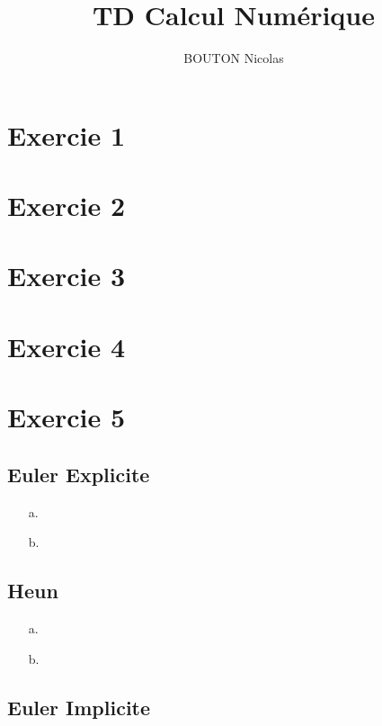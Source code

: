 \documentclass[12pt, letterpaper]{article}
\title{TD Calcul Numérique}
\author{BOUTON Nicolas}
\begin{document}
\maketitle

\section{Exercie 1}
\section{Exercie 2}
\section{Exercie 3}
\section{Exercie 4}
\section{Exercie 5}

\subsection{Euler Explicite}

\begin{enumerate}
\item[a.]

\item[b.]

\end{enumerate}

\subsection{Heun}

\begin{enumerate}
\item[a.]

\item[b.]

\end{enumerate}

\subsection{Euler Implicite}
\end{document}

